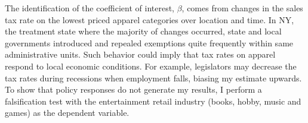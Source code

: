 \documentclass[12pt]{article}
\begin{document}
	The identification of the coefficient of interest, $\beta$, comes from changes in the sales tax rate on the lowest priced apparel categories over location and time. In NY, the treatment state where the majority of changes occurred, state and local governments introduced and repealed exemptions quite frequently within same administrative units. Such behavior could imply that tax rates on apparel respond to local economic conditions. For example, legislators may decrease the tax rates during recessions when employment falls, biasing my estimate upwards. To show that policy responses do not generate my results, I perform a falsification test with the entertainment retail industry (books, hobby, music and games) as the dependent variable.
	

	
	
	
	
	
\end{document}
